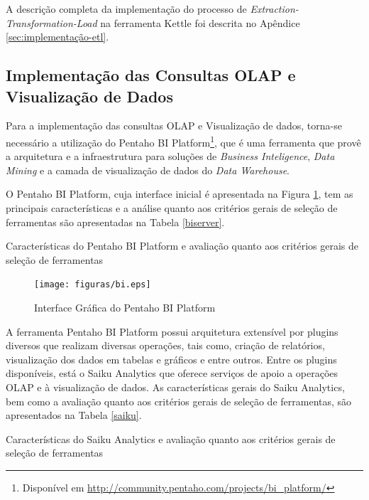 A descrição completa da implementação do processo de \textit{Extraction-Transformation-Load} na ferramenta Kettle foi descrita no Apêndice \ref{sec:implementação-etl}.

\subsection{Implementação das Consultas OLAP e Visualização de Dados}

Para a implementação das consultas OLAP e Visualização de dados, torna-se necessário a utilização do Pentaho BI Platform\footnote{Disponível em \url{http://community.pentaho.com/projects/bi_platform/}}, que é uma ferramenta que provê a arquitetura e a infraestrutura para soluções de \textit{Business Inteligence}, \textit{Data Mining} e a camada de visualização de dados do \textit{Data Warehouse}.


O Pentaho BI Platform, cuja interface inicial é apresentada na Figura \ref{BIplatform}, tem as principais características e a análise quanto aos critérios gerais de seleção de ferramentas são apresentadas na Tabela \ref{biserver}. 


\begin{table}[!ht]

\caption{Características do Pentaho BI Platform e avaliação quanto aos critérios gerais de seleção de ferramentas}
\label{biserver}
\end{table}
\FloatBarrier



\begin{figure}[ht!]
\begin{center}
\texttt{[image: figuras/bi.eps]}
\caption{Interface Gráfica do Pentaho BI Platform}
\label{BIplatform}
\end{center}
\end{figure}
\FloatBarrier
 

A ferramenta Pentaho BI Platform possui arquitetura extensível por plugins diversos que realizam diversas operações, tais como, criação de relatórios, visualização dos dados em tabelas e gráficos e entre outros. Entre os plugins disponíveis, está o Saiku Analytics que oferece serviços de apoio a operações OLAP e à visualização de dados. As características gerais do Saiku Analytics, bem como a avaliação quanto aos critérios gerais de seleção de ferramentas, são apresentados na Tabela \ref{saiku}. 

\begin{table}[!ht]

\caption{Características do Saiku Analytics e avaliação quanto aos critérios gerais de seleção de ferramentas}
\label{saiku}
\end{table}
\FloatBarrier

